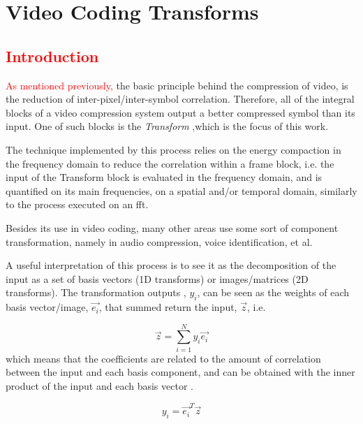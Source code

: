 \cleardoublepage
\chapter{Video Coding Transforms}

\section{\textcolor{red}{Introduction}}

\textcolor{red}{As mentioned previously,} the basic principle behind the compression of video, is the reduction of inter-pixel/inter-symbol correlation. Therefore, all of the integral blocks of a video compression system output a better compressed symbol than its input. One of such blocks is the \emph{Transform} 
,which is the focus of this work.


The technique implemented by this process relies on the energy compaction in the frequency domain to reduce the correlation within a frame block, i.e. the input of the Transform block is evaluated in the frequency domain, and is quantified on its main frequencies, on a spatial and/or temporal domain, similarly to the process executed on an \gls{fft}.

Besides its use in video coding, many other areas use some sort of component transformation, namely in audio compression, voice identification, et al.

A useful interpretation of this process is to see it as the decomposition of the input as a set of basis vectors (1D transforms) or images/matrices (2D transforms). The transformation outputs , $y_i$, can be seen as the weights of each basis vector/image, $\vec{e_i}$, that summed return the input, $\vec{z}$, i.e.

\begin{equation}
    \vec{z} = \sum_{i=1}^{N} y_i \vec{e_i}
\end{equation}
which means that the coefficients are related to the amount of correlation between the input and each basis component, and can be obtained with the inner product of the input and each basis vector \cite[sec. 4.1.4 \& 4.2.2]{shiImageVideoCompression2008}.

\begin{equation}
    y_i = \vec{e_i}^T \vec{z}
\end{equation}

